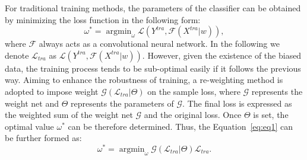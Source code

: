 \documentclass[letterpaper]{article} %
\begin{document}
For traditional training methods, the parameters of the classifier can be obtained by minimizing the loss function in the following form:
\begin{equation}
    \omega^* = \mathop{\arg\min}_\omega \mathcal{L}(Y^{tra},\mathcal{F}(X^{tra}|w)),
    \label{eq:eq1}
\end{equation}
where $\mathcal{F}$ always acts as a convolutional neural network.
In the following we denote $\mathcal{L}_{tra}$ as $\mathcal{L}(Y^{tra},\mathcal{F}(X^{tra}|w))$.
However, given the existence of the biased data, the training process tends to be sub-optimal easily if it follows the previous way.
Aiming to enhance the robustness of training, a re-weighting method is adopted to impose weight $\mathcal{G}(\mathcal{L}_{tra}|\Theta)$ on the sample loss, where $\mathcal{G}$ represents the weight net and $\Theta$ represents the parameters of $\mathcal{G}$.
The final loss is expressed as the weighted sum of the weight net $\mathcal{G}$ and the original loss.
Once $\Theta$ is set, the optimal value $\omega^*$ can be therefore determined.
Thus, the Equation~\ref{eq:eq1} can be further formed as:
\begin{equation}
    \omega^*  = \mathop{\arg\min}_\omega  \mathcal{G}(\mathcal{L}_{tra} |\Theta)\mathcal{L}_{tra}.
\end{equation}
\end{document}
